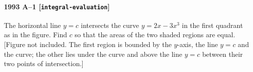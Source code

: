\paragraph{1993 A--1 \textnormal{[\texttt{integral-evaluation}]}}
The horizontal line $y=c$ intersects the curve $y = 2x - 3x^3$
in the first quadrant as in the figure. Find $c$ so that the areas of the
two shaded regions are equal. [Figure not included. The first region is
bounded by the $y$-axis, the line $y=c$ and the curve; the other lies
under the curve and above the line $y=c$ between their two points of
intersection.]
